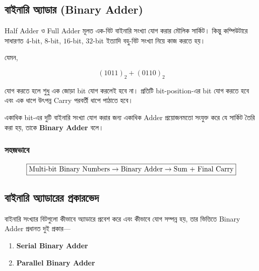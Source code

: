 
\subsection{বাইনারি অ্যাডার
(\textenglish{Binary Adder})}

\textenglish{Half Adder} ও \textenglish{Full Adder} মূলত এক-বিট
বাইনারি সংখ্যা যোগ করার মৌলিক সার্কিট। কিন্তু কম্পিউটারে সাধারণত
\(4\)-\textenglish{bit}, \(8\)-\textenglish{bit},
\(16\)-\textenglish{bit}, \(32\)-\textenglish{bit} ইত্যাদি বহু-বিট
সংখ্যা নিয়ে কাজ করতে হয়।

যেমন,

\[
(1011)_2+(0110)_2
\]

যোগ করতে হলে শুধু এক জোড়া \textenglish{bit} যোগ করলেই হবে না।
প্রতিটি \textenglish{bit-position}-এর \textenglish{bit} যোগ করতে হবে
এবং এক ধাপে উৎপন্ন \textenglish{Carry} পরবর্তী ধাপে পাঠাতে হবে।

একাধিক \textenglish{bit}-এর দুটি বাইনারি সংখ্যা যোগ করার জন্য
একাধিক \textenglish{Adder} প্রয়োজনমতো সংযুক্ত করে যে সার্কিট তৈরি করা হয়,
তাকে \textbf{\textenglish{Binary Adder}} বলে।

\subsubsection*{সহজভাবে}

\[
\boxed{
\text{\textenglish{Multi-bit Binary Numbers}}
\rightarrow
\text{\textenglish{Binary Adder}}
\rightarrow
\text{\textenglish{Sum + Final Carry}}
}
\]



\subsection{বাইনারি অ্যাডারের প্রকারভেদ}

বাইনারি সংখ্যার বিটগুলো কীভাবে অ্যাডারে প্রবেশ করে এবং কীভাবে যোগ
সম্পন্ন হয়, তার ভিত্তিতে \textenglish{Binary Adder} প্রধানত দুই প্রকার—

\begin{enumerate}[leftmargin=*,itemsep=2pt]
    \item \textbf{\textenglish{Serial Binary Adder}}
    \item \textbf{\textenglish{Parallel Binary Adder}}
\end{enumerate}


